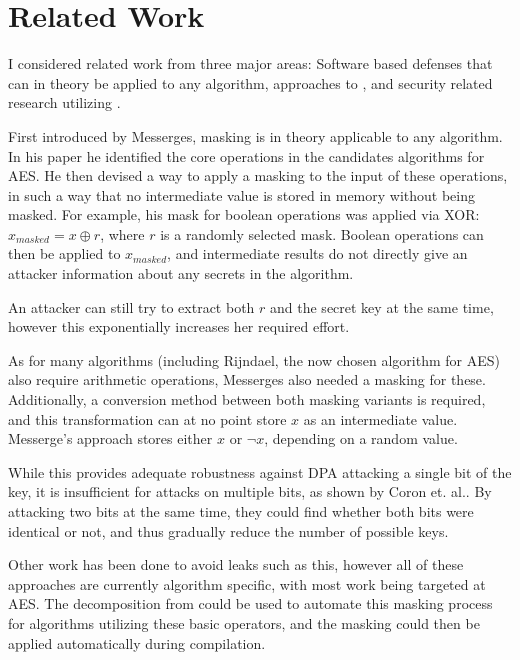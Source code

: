 \section{Related Work}
\label{related}
I considered related work from three major areas:
Software based \poweranalysis{} defenses that can in theory be applied to any algorithm, approaches to \dual{}, and security related research utilizing \llvm{}.

First introduced by Messerges\cite{messerges2000securing}, masking is in theory applicable to any algorithm.
In his paper he identified the core operations in the candidates algorithms for AES.
He then devised a way to apply a masking to the input of these operations, in such a way that no intermediate value is stored in memory without being masked.
For example, his mask for boolean operations was applied via XOR: $x_{masked} = x \oplus r$, where $r$ is a randomly selected mask.
Boolean operations can then be applied to $x_{masked}$, and intermediate results do not directly give an attacker information about any secrets in the algorithm.

An attacker can still try to extract both $r$ and the secret key at the same time, however this exponentially increases her required effort.

As for many algorithms (including Rijndael, the now chosen algorithm for AES) also require arithmetic operations, Messerges also needed a masking for these.
Additionally, a conversion method between both masking variants is required, and this transformation can at no point store $x$ as an intermediate value.
Messerge's approach stores either $x$ or $\neg{x}$, depending on a random value.

While this provides adequate robustness against DPA attacking a single bit of the key, it is insufficient for attacks on multiple bits, as shown by Coron et. al.\cite{coron2000boolean}.
By attacking two bits at the same time, they could find whether both bits were identical or not, and thus gradually reduce the number of possible keys.

Other work has been done to avoid leaks such as this\cite{akkar2001implementation}\cite{rivain2010provably}, however all of these approaches are currently algorithm specific, with most work being targeted at AES.
The decomposition from \cite{messerges2000securing} could be used to automate this masking process for algorithms utilizing these basic operators, and the masking could then be applied automatically during compilation.

